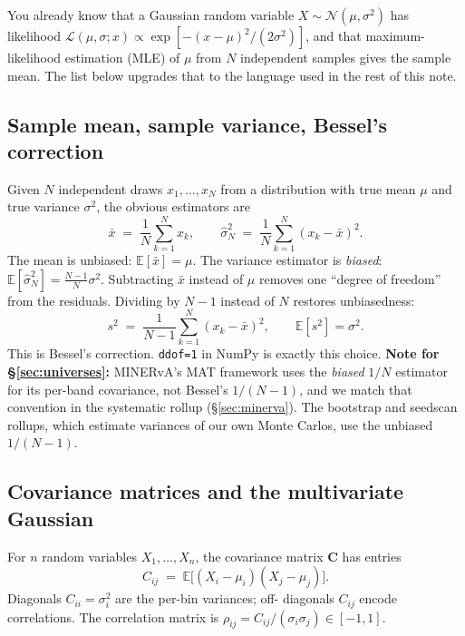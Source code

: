 \documentclass[12pt]{article}
\begin{document}
You already know that a Gaussian random variable $X \sim
\mathcal{N}(\mu, \sigma^{2})$ has likelihood
$\mathcal{L}(\mu, \sigma; x) \propto \exp[-(x-\mu)^{2}/(2\sigma^{2})]$,
and that maximum-likelihood estimation (MLE) of $\mu$ from $N$
independent samples gives the sample mean. The list below upgrades
that to the language used in the rest of this note.

\subsection{Sample mean, sample variance, Bessel's correction}
\label{sec:bessel}

Given $N$ independent draws $x_{1},\dots,x_{N}$ from a distribution
with true mean $\mu$ and true variance $\sigma^{2}$, the obvious
estimators are
\begin{equation}
\bar{x} \;=\; \frac{1}{N}\sum_{k=1}^{N} x_{k},
\qquad
\widehat{\sigma}^{2}_{N} \;=\; \frac{1}{N}\sum_{k=1}^{N} (x_{k}-\bar{x})^{2}.
\end{equation}
The mean is unbiased: $\mathbb{E}[\bar x]=\mu$. The variance estimator
is \emph{biased}: $\mathbb{E}[\widehat{\sigma}^{2}_{N}] =
\frac{N-1}{N}\sigma^{2}$. Subtracting $\bar{x}$ instead of $\mu$
removes one ``degree of freedom'' from the residuals. Dividing by
$N-1$ instead of $N$ restores unbiasedness:
\begin{equation}
s^{2} \;=\; \frac{1}{N-1}\sum_{k=1}^{N} (x_{k}-\bar x)^{2},
\qquad
\mathbb{E}[s^{2}] = \sigma^{2}.
\end{equation}
This is Bessel's correction. \texttt{ddof=1} in NumPy is exactly this
choice. \textbf{Note for \S\ref{sec:universes}:} MINERvA's MAT
framework uses the \emph{biased} $1/N$ estimator for its per-band
covariance, not Bessel's $1/(N-1)$, and we match that convention in
the systematic rollup (\S\ref{sec:minerva}). The bootstrap and
seedscan rollups, which estimate variances of our own Monte Carlos,
use the unbiased $1/(N-1)$.

\subsection{Covariance matrices and the multivariate Gaussian}
\label{sec:covmat}

For $n$ random variables $X_{1},\dots,X_{n}$, the covariance matrix
$\mathbf{C}$ has entries
\begin{equation}
C_{ij} \;=\; \mathbb{E}\big[(X_{i}-\mu_{i})(X_{j}-\mu_{j})\big].
\end{equation}
Diagonals $C_{ii}=\sigma_{i}^{2}$ are the per-bin variances; off-
diagonals $C_{ij}$ encode correlations. The correlation matrix is
$\rho_{ij} = C_{ij}/(\sigma_{i}\sigma_{j}) \in [-1, 1]$.
\end{document}
